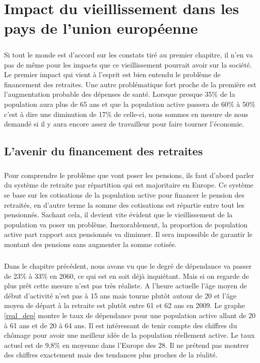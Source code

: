 \chapter{Impact du vieillissement dans les pays de l'union européenne}
\paragraph{}Si tout le monde est d’accord sur les constats tiré au premier chapitre, il n’en va pas de même pour les impacts que ce vieillissement pourrait avoir sur la société. Le premier impact qui vient à l’esprit est bien entendu le problème de financement des retraites. Une autre problématique fort proche de la première est l’augmentation probable des dépenses de santé. Lorsque presque 35\% de la population aura plus de 65 ans et que la population active passera de 60\% à 50\% c’est à dire une diminution de 17\% de celle-ci, nous sommes en mesure de nous demandé si il y aura encore assez de travailleur pour faire tourner l’économie.  

\section{L'avenir du financement des retraites}
\paragraph{}Pour comprendre le problème que vont poser les pensions, ils faut d’abord parler du système de retraite par répartition qui est majoritaire en Europe\citep{system_retraite}. Ce système se base sur les cotisations de la population active pour financer le pension des retraités, en d’autre terme la somme des cotisations est répartie entre tout les pensionnés\citep{retraite_repartition}. Sachant cela, il devient vite évident que le vieillissement de la population va poser un problème. Inexorablement, la proportion de population active part rapport aux pensionnés va diminuer. Il sera impossible de garantir le montant des pensions sans augmenter la somme cotisée.  

\paragraph{}Dans le chapitre précédent, nous avons vu que le degré de dépendance va passer de 23\% à 33\% en 2060, ce qui est en soit déjà inquiétant. Mais si on regarde de plus prêt cette mesure n’est pas très réaliste. A l’heure actuelle l’âge moyen de début d’activité n’est pas à 15 ans mais tourne plutôt autour de 20\citep[pp.27]{eul} et l’âge moyen de départ à la retraite est plutôt entre 61 et 62 ans en 2009\citep{eurocompar}. Le graphe \ref{real_dep} montre le taux de dépendance pour une population active allant de 20 à 61 ans et de 20 à 64 ans. Il est intéressant de tenir compte des chiffres du chômage pour avoir une meilleur idée de la population réellement active. Le taux actuel est de 9,8\% en moyenne dans l’Europe des 28\citep{chaumage}. Il ne prétend pas montrer des chiffres exactement mais des tendances plus proches de la réalité. 



